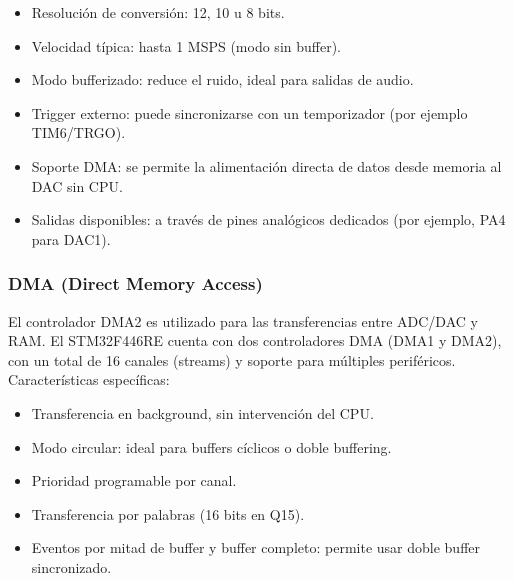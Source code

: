 \documentclass[12pt]{article}
\begin{document}
	\begin{itemize}
		\item Resolución de conversión: 12, 10 u 8 bits.
		
		\item Velocidad típica: hasta 1 MSPS (modo sin buffer).
		
		\item Modo bufferizado: reduce el ruido, ideal para salidas de audio.
		
		\item Trigger externo: puede sincronizarse con un temporizador (por ejemplo TIM6/TRGO).
		
		\item Soporte DMA: se permite la alimentación directa de datos desde memoria al DAC sin CPU.
		
		\item Salidas disponibles: a través de pines analógicos dedicados (por ejemplo, PA4 para DAC1).
	\end{itemize}
	
	\subsubsection{DMA (Direct Memory Access)}
	El controlador DMA2 es utilizado para las transferencias entre ADC/DAC y RAM. El STM32F446RE cuenta con dos controladores DMA (DMA1 y DMA2), con un total de 16 canales (streams) y soporte para múltiples periféricos. Características específicas:
	
	\begin{itemize}
		\item Transferencia en background, sin intervención del CPU.
		
		\item Modo circular: ideal para buffers cíclicos o doble buffering.
		
		\item Prioridad programable por canal.
		
		\item Transferencia por palabras (16 bits en Q15).
		
		\item Eventos por mitad de buffer y buffer completo: permite usar doble buffer sincronizado.
	\end{itemize}
	
\end{document}
